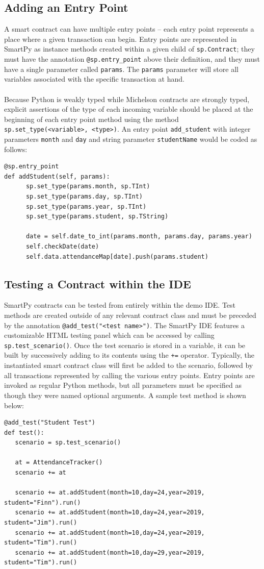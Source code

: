 \documentclass{article}
\begin{document}
\subsection{Adding an Entry Point}
A smart contract can have multiple entry points -- each entry point represents a place where a given transaction can begin. Entry points are represented in SmartPy as instance methods created within a given child of \lstinline!sp.Contract!; they must have the annotation \lstinline!@sp.entry_point! above their definition, and they must have a single parameter called \lstinline!params!. The \lstinline!params! parameter will store all variables associated with the specific transaction at hand.\\~\\
Because Python is weakly typed while Michelson contracts are strongly typed, explicit assertions of the type of each incoming variable should be placed at the beginning of each entry point method using the method \lstinline!sp.set_type(<variable>, <type>)!. An entry point \lstinline!add_student! with integer parameters \lstinline!month! and \lstinline!day! and string parameter \lstinline!studentName! would be coded as follows:
\begin{lstlisting}
@sp.entry_point
def addStudent(self, params):
      sp.set_type(params.month, sp.TInt)
      sp.set_type(params.day, sp.TInt)
      sp.set_type(params.year, sp.TInt)
      sp.set_type(params.student, sp.TString)

      date = self.date_to_int(params.month, params.day, params.year)
      self.checkDate(date)
      self.data.attendanceMap[date].push(params.student)
\end{lstlisting}
\subsection{Testing a Contract within the IDE}
SmartPy contracts can be tested from entirely within the demo IDE. Test methods are created outside of any relevant contract class and must be preceded by the annotation \lstinline!@add_test("<test name>")!. The SmartPy IDE features a customizable HTML testing panel which can be accessed by calling \lstinline!sp.test_scenario()!. Once the test scenario is stored in a variable, it can be built by successively adding to its contents using the \lstinline!+=! operator. Typically, the instantiated smart contract class will first be added to the scenario, followed by all transactions represented by calling the various entry points. Entry points are invoked as regular Python methods, but all parameters must be specified as though they were named optional arguments. A sample test method is shown below:
\begin{lstlisting}
@add_test("Student Test")
def test():
   scenario = sp.test_scenario()
   
   at = AttendanceTracker()
   scenario += at
   
   scenario += at.addStudent(month=10,day=24,year=2019, student="Finn").run()
   scenario += at.addStudent(month=10,day=24,year=2019, student="Jim").run()
   scenario += at.addStudent(month=10,day=24,year=2019, student="Tim").run()
   scenario += at.addStudent(month=10,day=29,year=2019, student="Tim").run()
\end{lstlisting}
\end{document}
